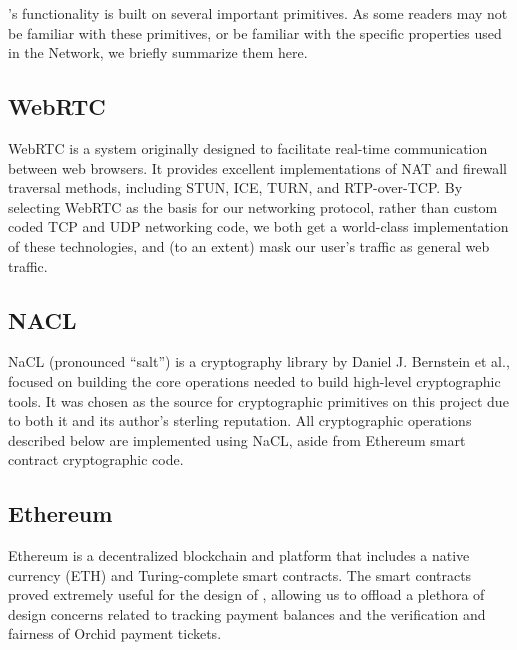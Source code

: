 
\Orchid’s functionality is built on several important primitives. As some readers may not be familiar with these primitives, or be familiar with the specific properties used in the \Orchid{} Network, we briefly summarize them here.

\subsection{WebRTC}

WebRTC\cite{webrtc} is a system originally designed to facilitate real-time communication between web browsers. It provides excellent implementations of NAT and firewall traversal methods, including STUN, ICE, TURN, and RTP-over-TCP. By selecting WebRTC as the basis for our networking protocol, rather than custom coded TCP and UDP networking code, we both get a world-class implementation of these technologies, and (to an extent) mask our user's traffic as general web traffic.

\subsection{NACL}

NaCL\cite{nacl} (pronounced ``salt'') is a cryptography library by Daniel J. Bernstein et al., focused on building the core operations needed to build high-level cryptographic tools. It was chosen as the source for cryptographic primitives on this project due to both it and its author's sterling reputation. All cryptographic operations described below are implemented using NaCL, aside from Ethereum smart contract cryptographic code.

\subsection{Ethereum}

Ethereum\cite{ethereum} is a decentralized blockchain and platform that includes a native currency (ETH) and Turing-complete smart contracts. The smart contracts proved extremely useful for the design of \Orchid, allowing us to offload a plethora of design concerns related to tracking payment balances and the verification and fairness of Orchid payment tickets.

